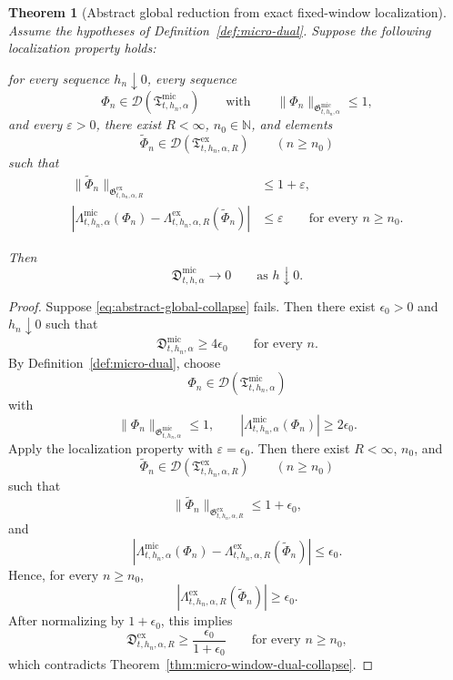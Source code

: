 \documentclass[11pt,a4paper]{amsart}
\theoremstyle{plain}
\newtheorem{theorem}{Theorem}[section]
\theoremstyle{definition}
\theoremstyle{remark}
\begin{document}
\begin{theorem}[Abstract global reduction from exact fixed-window localization]
\label{thm:abstract-global-reduction}
Assume the hypotheses of Definition~\ref{def:micro-dual}. Suppose the following localization
property holds:

\smallskip
\noindent
for every sequence \(h_n\downarrow0\), every sequence
\[
\Phi_n\in\mathcal D(\mathfrak T_{t,h_n,\alpha}^{\mathrm{mic}})
\qquad\text{with}\qquad
\|\Phi_n\|_{\mathfrak G_{t,h_n,\alpha}^{\mathrm{mic}}}\le1,
\]
and every \(\varepsilon>0\), there exist \(R<\infty\), \(n_0\in\mathbb N\), and elements
\[
\widetilde\Phi_n\in \mathcal D(\mathfrak T_{t,h_n,\alpha,R}^{\mathrm{ex}})
\qquad (n\ge n_0)
\]
such that
\begin{align}
\|\widetilde\Phi_n\|_{\mathfrak G_{t,h_n,\alpha,R}^{\mathrm{ex}}}
&\le
1+\varepsilon,
\label{eq:abstract-localize-norm}\\
\left|
\Lambda_{t,h_n,\alpha}^{\mathrm{mic}}(\Phi_n)
-
\Lambda_{t,h_n,\alpha,R}^{\mathrm{ex}}(\widetilde\Phi_n)
\right|
&\le
\varepsilon
\qquad\text{for every }n\ge n_0.
\label{eq:abstract-localize-functional}
\end{align}

\smallskip
\noindent
Then
\begin{equation}\label{eq:abstract-global-collapse}
\mathfrak D_{t,h,\alpha}^{\mathrm{mic}}
\longrightarrow0
\qquad\text{as }h\downarrow0.
\end{equation}
\end{theorem}

\begin{proof}
Suppose \eqref{eq:abstract-global-collapse} fails. Then there exist \(\epsilon_0>0\) and
\(h_n\downarrow0\) such that
\[
\mathfrak D_{t,h_n,\alpha}^{\mathrm{mic}}\ge 4\epsilon_0
\qquad\text{for every }n.
\]
By Definition~\ref{def:micro-dual}, choose
\[
\Phi_n\in\mathcal D(\mathfrak T_{t,h_n,\alpha}^{\mathrm{mic}})
\]
with
\[
\|\Phi_n\|_{\mathfrak G_{t,h_n,\alpha}^{\mathrm{mic}}}\le1,
\qquad
\left|
\Lambda_{t,h_n,\alpha}^{\mathrm{mic}}(\Phi_n)
\right|
\ge
2\epsilon_0.
\]
Apply the localization property with \(\varepsilon=\epsilon_0\). Then there exist \(R<\infty\),
\(n_0\), and
\[
\widetilde\Phi_n\in \mathcal D(\mathfrak T_{t,h_n,\alpha,R}^{\mathrm{ex}})
\qquad(n\ge n_0)
\]
such that
\[
\|\widetilde\Phi_n\|_{\mathfrak G_{t,h_n,\alpha,R}^{\mathrm{ex}}}\le1+\epsilon_0,
\]
and
\[
\left|
\Lambda_{t,h_n,\alpha}^{\mathrm{mic}}(\Phi_n)
-
\Lambda_{t,h_n,\alpha,R}^{\mathrm{ex}}(\widetilde\Phi_n)
\right|
\le
\epsilon_0.
\]
Hence, for every \(n\ge n_0\),
\[
\left|
\Lambda_{t,h_n,\alpha,R}^{\mathrm{ex}}(\widetilde\Phi_n)
\right|
\ge
\epsilon_0.
\]
After normalizing by \(1+\epsilon_0\), this implies
\[
\mathfrak D_{t,h_n,\alpha,R}^{\mathrm{ex}}
\ge
\frac{\epsilon_0}{1+\epsilon_0}
\qquad\text{for every }n\ge n_0,
\]
which contradicts Theorem~\ref{thm:micro-window-dual-collapse}.
\end{proof}
\end{document}
